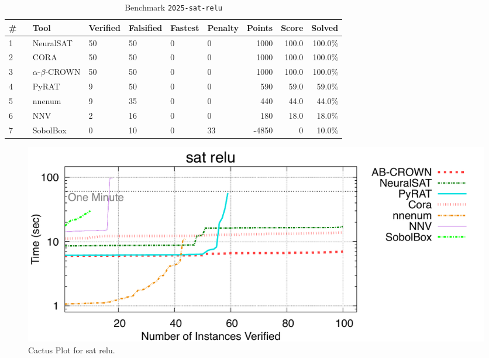 \begin{table}[h]
\begin{center}
\caption{Benchmark \texttt{2025-sat-relu}} \label{tab:cat_2025_sat_relu}
{\setlength{\tabcolsep}{2pt}
\begin{tabular}[h]{@{}llllllrrr@{}}
\toprule
\textbf{\# ~} & \textbf{Tool} & \textbf{Verified} & \textbf{Falsified} & \textbf{Fastest} & \textbf{Penalty} & \textbf{Points} & \textbf{Score} & \textbf{Solved}\\
\midrule
1 & NeuralSAT & 50 & 50 & 0 & 0 & 1000 & 100.0 & 100.0\% \\
2 & CORA & 50 & 50 & 0 & 0 & 1000 & 100.0 & 100.0\% \\
3 & $\alpha$-$\beta$-CROWN & 50 & 50 & 0 & 0 & 1000 & 100.0 & 100.0\% \\
4 & PyRAT & 9 & 50 & 0 & 0 & 590 & 59.0 & 59.0\% \\
5 & nnenum & 9 & 35 & 0 & 0 & 440 & 44.0 & 44.0\% \\
6 & NNV & 2 & 16 & 0 & 0 & 180 & 18.0 & 18.0\% \\
7 & SobolBox & 0 & 10 & 0 & 33 & -4850 & 0 & 10.0\% \\
\bottomrule
\end{tabular}
}
\end{center}
\end{table}



\begin{figure}[h]
\centerline{\includegraphics[width=\textwidth]{cactus/2025_sat_relu.pdf}}
\caption{Cactus Plot for sat relu.}
\label{fig:quantPic}
\end{figure}


\clearpage

